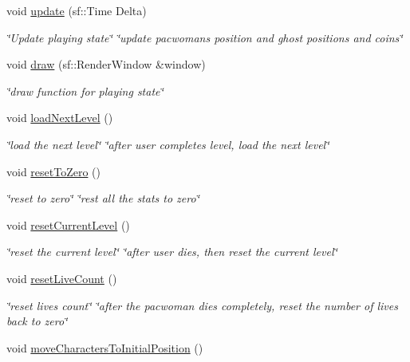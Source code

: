 \begin{DoxyCompactItemize}
void \hyperlink{classPlayingState_a5ca082ab48662e4a4836de1a2c15e6fd}{update} (sf\+::\+Time Delta)
\begin{DoxyCompactList}\small\item\em \char`\"{}\+Update playing state\char`\"{}  \char`\"{}update pacwoman\textquotesingle{}s position and ghost positions and coins\char`\"{} \end{DoxyCompactList}\item 
void \hyperlink{classPlayingState_ad7ac98b6b522060dbff840ce2f5d38d0}{draw} (sf\+::\+Render\+Window \&window)
\begin{DoxyCompactList}\small\item\em \char`\"{}draw function for playing state\char`\"{} \end{DoxyCompactList}\item 
void \hyperlink{classPlayingState_abbf53be223552107f95020420d045a10}{load\+Next\+Level} ()
\begin{DoxyCompactList}\small\item\em \char`\"{}load the next level\char`\"{}  \char`\"{}after user completes level, load the next level\char`\"{} \end{DoxyCompactList}\item 
void \hyperlink{classPlayingState_a1c8c1efbf757a3b62feda27bd7f25211}{reset\+To\+Zero} ()
\begin{DoxyCompactList}\small\item\em \char`\"{}reset to zero\char`\"{}  \char`\"{}rest all the stats to zero\char`\"{} \end{DoxyCompactList}\item 
void \hyperlink{classPlayingState_a8b888a00a70d07082dc614b3897984a5}{reset\+Current\+Level} ()
\begin{DoxyCompactList}\small\item\em \char`\"{}reset the current level\char`\"{}  \char`\"{}after user dies, then reset the current level\char`\"{} \end{DoxyCompactList}\item 
void \hyperlink{classPlayingState_a528cb58eb4e5b1db4f20e4f6beeed513}{reset\+Live\+Count} ()
\begin{DoxyCompactList}\small\item\em \char`\"{}reset lives count\char`\"{}  \char`\"{}after the pacwoman dies completely, reset the number of lives back to zero\char`\"{} \end{DoxyCompactList}\item 
void \hyperlink{classPlayingState_a18d73977b811f57fd1328e76b69f39a6}{move\+Characters\+To\+Initial\+Position} ()

\end{DoxyCompactItemize}
